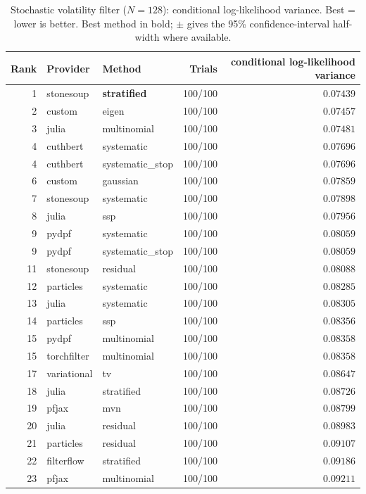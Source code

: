 \begin{table}[!htbp]
\centering
\small
\caption{Stochastic volatility filter ($N=128$): conditional log-likelihood variance. Best = lower is better. Best method in bold; $\pm$ gives the 95\% confidence-interval half-width where available.}
\label{tab:stochastic-volatility-filter-conditional-loglik-variance}
\begin{tabular}{rllrr}
\toprule
Rank & Provider & Method & Trials & conditional log-likelihood variance \\
\midrule
1 & stonesoup & \textbf{stratified} & 100/100 & $\mathbf{0.07439}$ \\
2 & custom & eigen & 100/100 & $0.07457$ \\
3 & julia & multinomial & 100/100 & $0.07481$ \\
4 & cuthbert & systematic & 100/100 & $0.07696$ \\
4 & cuthbert & systematic\_stop & 100/100 & $0.07696$ \\
6 & custom & gaussian & 100/100 & $0.07859$ \\
7 & stonesoup & systematic & 100/100 & $0.07898$ \\
8 & julia & ssp & 100/100 & $0.07956$ \\
9 & pydpf & systematic & 100/100 & $0.08059$ \\
9 & pydpf & systematic\_stop & 100/100 & $0.08059$ \\
11 & stonesoup & residual & 100/100 & $0.08088$ \\
12 & particles & systematic & 100/100 & $0.08285$ \\
13 & julia & systematic & 100/100 & $0.08305$ \\
14 & particles & ssp & 100/100 & $0.08356$ \\
15 & pydpf & multinomial & 100/100 & $0.08358$ \\
15 & torchfilter & multinomial & 100/100 & $0.08358$ \\
17 & variational & tv & 100/100 & $0.08647$ \\
18 & julia & stratified & 100/100 & $0.08726$ \\
19 & pfjax & mvn & 100/100 & $0.08799$ \\
20 & julia & residual & 100/100 & $0.08983$ \\
21 & particles & residual & 100/100 & $0.09107$ \\
22 & filterflow & stratified & 100/100 & $0.09186$ \\
23 & pfjax & multinomial & 100/100 & $0.09211$ \\

\end{tabular}
\end{table}
